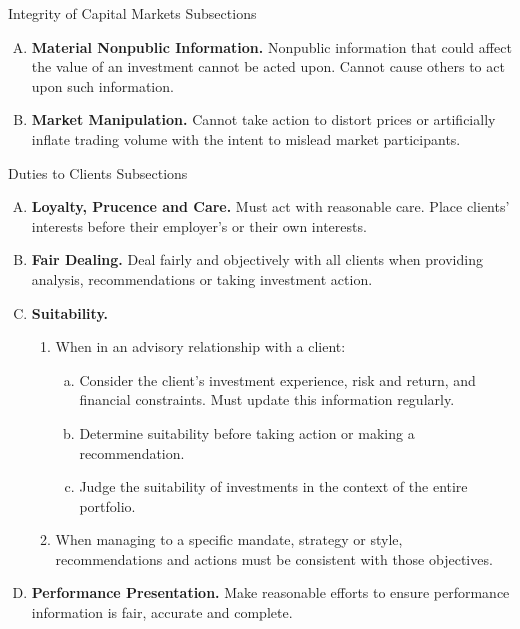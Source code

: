\documentclass[../custom,grid]{flashcards}
\begin{document}
\begin{flashcard}{Integrity of Capital Markets Subsections}
    \begin{enumerate}[A.]
        \item \textbf{Material Nonpublic Information.} Nonpublic information that could affect the value of an investment cannot be acted upon. Cannot cause others to act upon such information.
        \item \textbf{Market Manipulation.} Cannot take action to distort prices or artificially inflate trading volume with the intent to mislead market participants.
    \end{enumerate}
\end{flashcard}

\begin{flashcard}{Duties to Clients Subsections}
    \begin{enumerate}[A.]
        \item \textbf{Loyalty, Prucence and Care.} Must act with reasonable care. Place clients' interests before their employer's or their own interests.
        \item \textbf{Fair Dealing.} Deal fairly and objectively with all clients when providing analysis, recommendations or taking investment action.
        \item \textbf{Suitability.}
            \begin{enumerate}[1.]
                \item When in an advisory relationship with a client:
                    \begin{enumerate}[a.]
                        \item Consider the client's investment experience, risk and return, and financial constraints. Must update this information regularly.
                        \item Determine suitability before taking action or making a recommendation.
                        \item Judge the suitability of investments in the context of the entire portfolio.
                    \end{enumerate}
                \item When managing to a specific mandate, strategy or style, recommendations and actions must be consistent with those objectives.
            \end{enumerate}
        \item \textbf{Performance Presentation.} Make reasonable efforts to ensure performance information is fair, accurate and complete.

\end{enumerate}
\end{flashcard}
\end{document}
